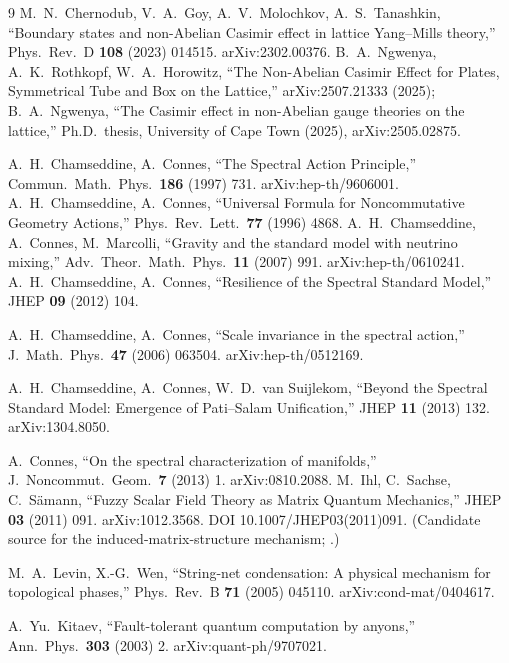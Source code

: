 \begin{thebibliography}{9}
M.~N.~Chernodub, V.~A.~Goy, A.~V.~Molochkov, A.~S.~Tanashkin, ``Boundary states and non-Abelian Casimir effect in lattice Yang--Mills theory,'' Phys.\ Rev.\ D \textbf{108} (2023) 014515. arXiv:2302.00376.
B.~A.~Ngwenya, A.~K.~Rothkopf, W.~A.~Horowitz, ``The Non-Abelian Casimir Effect for Plates, Symmetrical Tube and Box on the Lattice,'' arXiv:2507.21333 (2025); B.~A.~Ngwenya, ``The Casimir effect in non-Abelian gauge theories on the lattice,'' Ph.D.\ thesis, University of Cape Town (2025), arXiv:2505.02875.

A.~H.~Chamseddine, A.~Connes, ``The Spectral Action Principle,'' Commun.\ Math.\ Phys.\ \textbf{186} (1997) 731. arXiv:hep-th/9606001.
A.~H.~Chamseddine, A.~Connes, ``Universal Formula for Noncommutative Geometry Actions,'' Phys.\ Rev.\ Lett.\ \textbf{77} (1996) 4868.
A.~H.~Chamseddine, A.~Connes, M.~Marcolli, ``Gravity and the standard model with neutrino mixing,'' Adv.\ Theor.\ Math.\ Phys.\ \textbf{11} (2007) 991. arXiv:hep-th/0610241.
A.~H.~Chamseddine, A.~Connes, ``Resilience of the Spectral Standard Model,'' JHEP \textbf{09} (2012) 104.

A.~H.~Chamseddine, A.~Connes, ``Scale invariance in the spectral action,'' J.\ Math.\ Phys.\ \textbf{47} (2006) 063504. arXiv:hep-th/0512169.

A.~H.~Chamseddine, A.~Connes, W.~D.~van Suijlekom, ``Beyond the Spectral Standard Model: Emergence of Pati--Salam Unification,'' JHEP \textbf{11} (2013) 132. arXiv:1304.8050.

A.~Connes, ``On the spectral characterization of manifolds,'' J.\ Noncommut.\ Geom.\ \textbf{7} (2013) 1. arXiv:0810.2088.
M.~Ihl, C.~Sachse, C.~S\"amann, ``Fuzzy Scalar Field Theory as Matrix Quantum Mechanics,'' JHEP \textbf{03} (2011) 091. arXiv:1012.3568. DOI 10.1007/JHEP03(2011)091. (Candidate source for the induced-matrix-structure mechanism; .)

M.~A.~Levin, X.-G.~Wen, ``String-net condensation: A physical mechanism for topological phases,'' Phys.\ Rev.\ B \textbf{71} (2005) 045110. arXiv:cond-mat/0404617.

A.~Yu.~Kitaev, ``Fault-tolerant quantum computation by anyons,'' Ann.\ Phys.\ \textbf{303} (2003) 2. arXiv:quant-ph/9707021.


\end{thebibliography}
